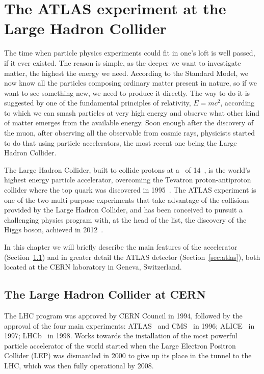 \clearpage{\pagestyle{empty}\cleardoublepage}

\chapter{The ATLAS experiment at the Large Hadron Collider}\label{chap:atlas}

The time when particle physics experiments could fit in one's
loft is well passed, if it ever existed. The reason is simple,
as the deeper we want to investigate matter, the highest the energy
we need. According to the Standard Model, we now know all the
particles composing ordinary matter present in nature, so if we
want to see something new, we need to produce it directly. The way to
do it is suggested by one of the fundamental principles of relativity,
$E=mc^2$, according to which we can smash particles at very high energy
and observe what other kind of matter emerges from the
available energy.
Soon enough after the discovery of the muon, after observing all
the observable from cosmic rays, physicists
started to do that using particle accelerators, the most
recent one being the Large Hadron Collider.

The Large Hadron Collider, built to collide protons at a \cme\ of 14~\tev, 
is the world's highest energy particle accelerator, overcoming the Tevatron
proton-antiproton collider where the top quark was discovered
in 1995~\cite{PhysRevLett.74.2422,PhysRevLett.74.2626}.
The ATLAS experiment is one of the two multi-purpose experiments 
that take advantage
of the collisions provided by the Large Hadron Collider,
and has been conceived to pursuit a challenging physics program with,
at the head of the list, the discovery of the Higgs boson, achieved
in 2012~\cite{2012gk}.

In this chapter we will briefly describe the main features of 
the accelerator (Section~\ref{sec:lhc}) and in greater detail 
the ATLAS detector (Section~\ref{sec:atlas}), 
both located at the CERN laboratory in Geneva,
Switzerland.


\section{The Large Hadron Collider at CERN}\label{sec:lhc}

The LHC program was approved by CERN Council in 1994, followed by the approval of
the four main experiments: ATLAS~\cite{Aad:2008zzm} and CMS~\cite{cms}
in 1996; ALICE~\cite{alice} in 1997; LHCb~\cite{lhcb} in 1998.
Works towards the installation of the most powerful particle accelerator of the world
started when the Large Electron Positron Collider (LEP) was dismantled in 2000 to 
give up its place in the tunnel to the LHC, which was then fully operational by 2008.

